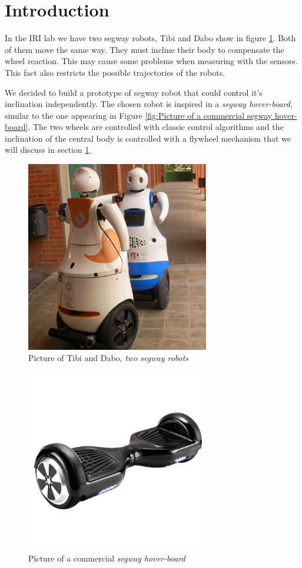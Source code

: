 \section{Introduction}
In the IRI lab we have two segway robots, Tibi and Dabo show in figure
\ref{fig:Picture of Tibi and Dabo}. Both of them move the same way.
They must incline their body to compensate the wheel reaction. 
This may cause some problems when measuring with the sensors.
This fact also restricts the possible trajectories of the robots. 

We decided to build a prototype of segway robot that could control it's
inclination independently. The chosen robot is inspired in a \textit{segway hover-board}, 
similar to the one appearing in Figure \ref{fig:Picture of a commercial 
segway hover-board}. The two wheels are controlled with classic
control algorithms and the inclination of the central body is
controlled with a flywheel mechanism that we will discuss in section \ref{}.

\begin{figure}
	\centering
	\includegraphics[width=8cm]{img/robots-TIBI-i-DABO-IRI-red.jpg}
	\caption{Picture of Tibi and Dabo, \textit{two segway robots} }
	\label{fig:Picture of Tibi and Dabo}
\end{figure}

\begin{figure}
	\centering
	\includegraphics[width=8cm]{img/segway_hoverboard_picture.png}
	\caption{Picture of a commercial \textit{segway hover-board} }
	\label{fig:Picture of a commercial segway hover-board}
\end{figure}

